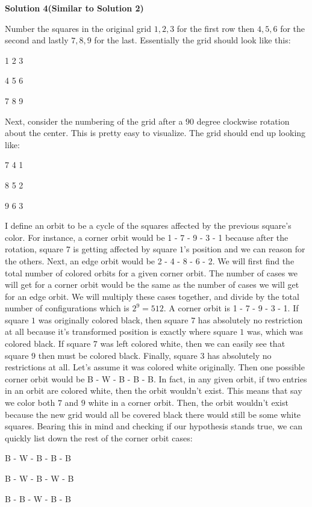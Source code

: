 \begin{enumerate}
 



\textbf{Solution 4(Similar to Solution 2)}

Number the squares in the original grid $1,2,3$ for the first row then $4,5,6$ for the second and lastly $7,8,9$ for the last. Essentially the grid should look like this:

 1 2 3

 4 5 6

 7 8 9

 Next, consider the numbering of the grid after a $90$ degree clockwise rotation about the center. This is pretty easy to visualize. The grid should end up looking like:

 7 4 1

 8 5 2

 9 6 3

 I define an orbit to be a cycle of the squares affected by the previous square's color. For instance, a corner orbit would be 1 - 7 - 9 - 3 - 1 because after the rotation, square $7$ is getting affected by square $1$'s position and we can reason for the others. Next, an edge orbit would be 2 - 4 - 8 - 6 - 2. We will first find the total number of colored orbits for a given corner orbit. The number of cases we will get for a corner orbit would be the same as the number of cases we will get for an edge orbit. We will multiply these cases together, and divide by the total number of configurations which is $2^{9} = 512$. A corner orbit is 1 - 7 - 9 - 3 - 1. If square $1$ was originally colored black, then square $7$ has absolutely no restriction at all because it's transformed position is exactly where square $1$ was, which was colored black. If square $7$ was left colored white, then we can easily see that square $9$ then must be colored black. Finally, square $3$ has absolutely no restrictions at all. Let's assume it was colored white originally. Then one possible corner orbit would be B - W - B - B - B. In fact, in any given orbit, if two entries in an orbit are colored white, then the orbit wouldn't exist. This means that say we color both $7$ and $9$ white in a corner orbit. Then, the orbit wouldn't exist because the new grid would all be covered black there would still be some white squares. Bearing this in mind and checking if our hypothesis stands true, we can quickly list down the rest of the corner orbit cases:

 B - W - B - B - B

 B - W - B - W - B

 B - B - W - B - B


\end{enumerate}
